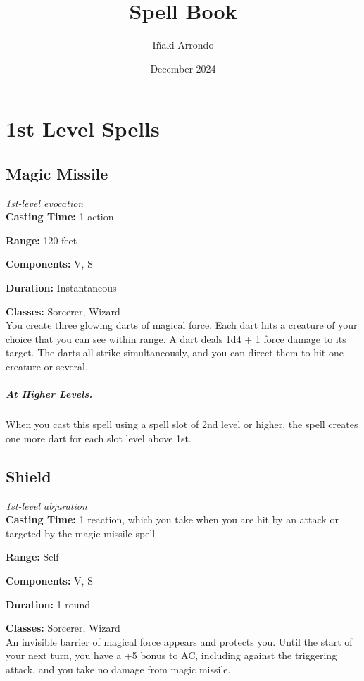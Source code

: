 \documentclass[a6paper,8pt]{book}
\title{Spell Book}
\author{Iñaki Arrondo}
\date{December 2024}
\begin{document}
\maketitle

\tableofcontents

\chapter{1st Level Spells}

\newpage
\section{Magic Missile}
\noindent\textit{1st-level evocation}\\

\textbf{Casting Time:} 1 action

\textbf{Range:} 120 feet
 
\textbf{Components:} V, S

\textbf{Duration:} Instantaneous 

\textbf{Classes:} Sorcerer, Wizard\\

You create three glowing darts of magical force. Each dart hits a creature of your choice that you can see within range. A dart deals 1d4 + 1 force damage to its target. The darts all strike simultaneously, and you can direct them to hit one creature or several. \\

\paragraph{At Higher Levels.} When you cast this spell using a spell slot of 2nd level or higher, the spell creates one more dart for each slot level above 1st.

\newpage
\section{Shield}
\noindent\textit{1st-level abjuration}\\

\textbf{Casting Time:} 1 reaction, which you take when you are hit by an attack or targeted by the magic missile spell

\textbf{Range:} Self

\textbf{Components:} V, S

\textbf{Duration:} 1 round

\textbf{Classes:} Sorcerer, Wizard\\

An invisible barrier of magical force appears and protects you. Until the start of your next turn, you have a +5 bonus to AC, including against the triggering attack, and you take no damage from magic missile.




\end{document}

